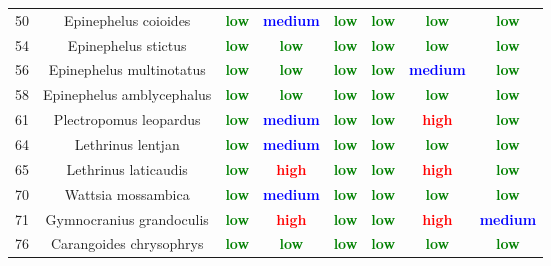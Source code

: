 \documentclass{report}\usepackage[]{graphicx}\usepackage[]{color}
\begin{document}
\begin{table}[ht]
{\begin{tabular}{cccccccc}
   50 & Epinephelus coioides & \textcolor{green}{\textbf{low}} & \textcolor{blue}{\textbf{medium}} & \textcolor{green}{\textbf{low}} & \textcolor{green}{\textbf{low}} & \textcolor{green}{\textbf{low}} & \textcolor{green}{\textbf{low}} \\ 
   54 & Epinephelus stictus & \textcolor{green}{\textbf{low}} & \textcolor{green}{\textbf{low}} & \textcolor{green}{\textbf{low}} & \textcolor{green}{\textbf{low}} & \textcolor{green}{\textbf{low}} & \textcolor{green}{\textbf{low}} \\ 
   56 & Epinephelus multinotatus & \textcolor{green}{\textbf{low}} & \textcolor{green}{\textbf{low}} & \textcolor{green}{\textbf{low}} & \textcolor{green}{\textbf{low}} & \textcolor{blue}{\textbf{medium}} & \textcolor{green}{\textbf{low}} \\ 
   58 & Epinephelus amblycephalus & \textcolor{green}{\textbf{low}} & \textcolor{green}{\textbf{low}} & \textcolor{green}{\textbf{low}} & \textcolor{green}{\textbf{low}} & \textcolor{green}{\textbf{low}} & \textcolor{green}{\textbf{low}} \\ 
   61 & Plectropomus leopardus & \textcolor{green}{\textbf{low}} & \textcolor{blue}{\textbf{medium}} & \textcolor{green}{\textbf{low}} & \textcolor{green}{\textbf{low}} & \textcolor{red}{\textbf{high}} & \textcolor{green}{\textbf{low}} \\ 
   64 & Lethrinus lentjan & \textcolor{green}{\textbf{low}} & \textcolor{blue}{\textbf{medium}} & \textcolor{green}{\textbf{low}} & \textcolor{green}{\textbf{low}} & \textcolor{green}{\textbf{low}} & \textcolor{green}{\textbf{low}} \\ 
   65 & Lethrinus laticaudis & \textcolor{green}{\textbf{low}} & \textcolor{red}{\textbf{high}} & \textcolor{green}{\textbf{low}} & \textcolor{green}{\textbf{low}} & \textcolor{red}{\textbf{high}} & \textcolor{green}{\textbf{low}} \\ 
   70 & Wattsia mossambica & \textcolor{green}{\textbf{low}} & \textcolor{blue}{\textbf{medium}} & \textcolor{green}{\textbf{low}} & \textcolor{green}{\textbf{low}} & \textcolor{green}{\textbf{low}} & \textcolor{green}{\textbf{low}} \\ 
   71 & Gymnocranius grandoculis & \textcolor{green}{\textbf{low}} & \textcolor{red}{\textbf{high}} & \textcolor{green}{\textbf{low}} & \textcolor{green}{\textbf{low}} & \textcolor{red}{\textbf{high}} & \textcolor{blue}{\textbf{medium}} \\ 
   76 & Carangoides chrysophrys & \textcolor{green}{\textbf{low}} & \textcolor{green}{\textbf{low}} & \textcolor{green}{\textbf{low}} & \textcolor{green}{\textbf{low}} & \textcolor{green}{\textbf{low}} & \textcolor{green}{\textbf{low}} \\ 

\end{tabular}}
\end{table}
\end{document}
